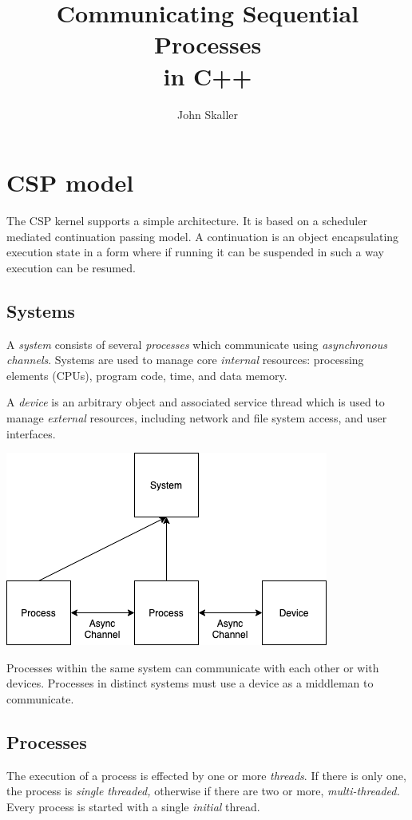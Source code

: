 \documentclass[oneside]{book}
\title{Communicating Sequential Processes\\ in C++}
\author{John Skaller}
\begin{document}
\maketitle
\tableofcontents
\chapter{CSP model}
The CSP kernel supports a simple architecture. It is based on a scheduler mediated
continuation passing model. A continuation is an object encapsulating execution
state in a form where if running it can be suspended in such a way execution
can be resumed.

\section{Systems}
A {\em system} consists of several {\em processes} which communicate
using {\em asynchronous channels}. Systems are used to manage 
core {\em internal} resources: processing elements (CPUs), program code,
time, and data memory.

A {\em device} is an arbitrary object and associated service thread which is
used to manage {\em external} resources, including network and file system access,
and user interfaces.


\includegraphics{../src/tex/system.png}

Processes within the same system can communicate with each other or
with devices. Processes in distinct systems must use a device as
a middleman to communicate.

\section{Processes}
The execution of a process is effected by one or more {\em threads}.
If there is only one, the process is {\em single threaded,} otherwise
if there are two or more, {\em multi-threaded.} Every process is started
with a single {\em initial} thread.
\end{document}
